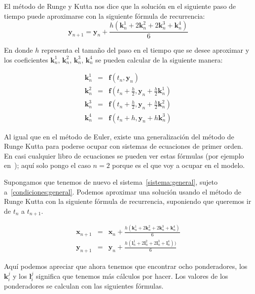El método de Runge y Kutta nos dice que la solución en el siguiente paso de tiempo puede aproximarse con la siguiente fórmula de recurrencia:
$$\textbf{y}_{n+1} = \textbf{y}_n + \frac{h \left(\textbf{k}_{n}^{1} + 2\textbf{k}_{n}^{2} + 2\textbf{k}_{n}^{3} + \textbf{k}_{n}^{4} \right)}{6} $$
 
En donde $h$ representa el tamaño del paso en el tiempo que se desee aproximar y los coeficientes $\textbf{k}_{n}^{1}$, $\textbf{k}_{n}^{2}$, $\textbf{k}_{n}^{3}$, $\textbf{k}_{n}^{4}$ se pueden calcular de la siguiente manera:

\begin{eqnarray}
\textbf{k}_{n}^{1} & = & \textbf{f}(t_n, \textbf{y}_n) \nonumber \\
\textbf{k}_{n}^{2} & = & \textbf{f}(t_n + \frac{h}{2}, \textbf{y}_n + \frac{h}{2} \textbf{k}_{n}^{1}) \nonumber \\
\textbf{k}_{n}^{3} & = & \textbf{f}(t_n + \frac{h}{2}, \textbf{y}_n + \frac{h}{2} \textbf{k}_{n}^{2}) \nonumber \\
\textbf{k}_{n}^{4} & = & \textbf{f}(t_n + h, \textbf{y}_n + h\textbf{k}_{n}^{3}) \nonumber
\end{eqnarray}

Al igual que en el método de Euler, existe una generalización del método de Runge Kutta para poderse ocupar con sistemas de ecuaciones de primer orden.
En casi cualquier libro de ecuaciones se pueden ver estas fórmulas (por ejemplo en~\cite{Blanchard:Ecuaciones}); aquí solo pongo el caso $n=2$ porque es el que voy a ocupar en el modelo.

Supongamos que tenemos de nuevo el sistema~\eqref{sistema:general}, sujeto a~\eqref{condiciones:general}.
Podemos aproximar una solución usando el método de Runge Kutta con la siguiente fórmula de recurrencia, suponiendo que queremos ir de $t_n$ a $t_{n+1}$.

\begin{eqnarray}
\textbf{x}_{n+1} & = & \textbf{x}_n + \frac{h(\textbf{k}_{n}^{1} + 2\textbf{k}_{n}^{2} + 2\textbf{k}_{n}^{3} + \textbf{k}_{n}^{4})}{6} \nonumber \\
\textbf{y}_{n+1} & = & \textbf{y}_n + \frac{h(\textbf{l}_{n}^{1} + 2\textbf{l}_{n}^{2} + 2\textbf{l}_{n}^{3} + \textbf{l}_{n}^{4}))}{6} \nonumber
\end{eqnarray}

Aquí podemos apreciar que ahora tenemos que encontrar ocho ponderadores, los $\textbf{k}_{i}^{j}$ y los $\textbf{l}_{i}^{j}$ significa que tenemos más cálculos por hacer.
Los valores de los ponderadores se calculan con las siguientes fórmulas.

